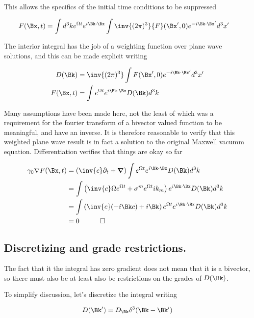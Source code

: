 \documentclass[]{eliblog}
\begin{document}
This allows the specifics of the initial time conditions to be suppressed

\begin{align}
F(\Bx,t) &= \int d^3 k e^{\Omega t} e^{i \Bk \cdot \Bx} \int \inv{(2\pi)^3} {F}(\Bx',0) e^{-i \Bk \cdot \Bx'}  d^3 x'
\end{align}

The interior integral has the job of a weighting function over plane wave solutions, and this can be made explicit writing

\begin{align}
D(\Bk) &= \inv{(2\pi)^3} \int {F}(\Bx',0) e^{-i \Bk \cdot \Bx'}  d^3 x' \\
F(\Bx,t) &= \int e^{\Omega t} e^{i \Bk \cdot \Bx} D(\Bk) d^3 k
\end{align}

Many assumptions have been made here, not the least of which was a requirement for the fourier transform of a bivector valued function to be meaningful, and have an inverse.  It is therefore reasonable to verify that this weighted plane wave result is in fact a solution to the original Maxwell vacumm equation.  Differentiation verifies that things are okay so far

\begin{align*}
\gamma_0 \grad F(\Bx,t)
&=
\left(\inv{c}\partial_t + \spacegrad \right)\int e^{\Omega t} e^{i \Bk \cdot \Bx} D(\Bk) d^3 k \\
&=
\int \left(\inv{c}\Omega e^{\Omega t} + \sigma^m e^{\Omega t} i k_m \right) e^{i \Bk \cdot \Bx} D(\Bk) d^3 k \\
&=
\int \left(\inv{c}(-i \Bk c) + i \Bk \right) e^{\Omega t} e^{i \Bk \cdot \Bx} D(\Bk) d^3 k \\
&= 0 \quad\quad\quad\square
\end{align*}

\subsection{Discretizing and grade restrictions.}

The fact that it the integral has zero gradient does not mean that it is a bivector, so there must
also be at least also be restrictions on the grades of $D(\Bk)$.

To simplify discussion, let's discretize the integral writing

\begin{align*}
D(\Bk') = D_\Bk \delta^3 (\Bk - \Bk')
\end{align*}
\end{document}

